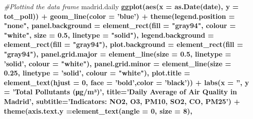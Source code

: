 \documentclass[
]{article}
\newenvironment{Shaded}{\begin{snugshade}}{\end{snugshade}}
\newcommand{\CommentTok}[1]{\textcolor[rgb]{0.56,0.35,0.01}{\textit{#1}}}
\newcommand{\DataTypeTok}[1]{\textcolor[rgb]{0.13,0.29,0.53}{#1}}
\newcommand{\DecValTok}[1]{\textcolor[rgb]{0.00,0.00,0.81}{#1}}
\newcommand{\FloatTok}[1]{\textcolor[rgb]{0.00,0.00,0.81}{#1}}
\newcommand{\KeywordTok}[1]{\textcolor[rgb]{0.13,0.29,0.53}{\textbf{#1}}}
\newcommand{\NormalTok}[1]{#1}
\newcommand{\OperatorTok}[1]{\textcolor[rgb]{0.81,0.36,0.00}{\textbf{#1}}}
\newcommand{\StringTok}[1]{\textcolor[rgb]{0.31,0.60,0.02}{#1}}
\begin{document}
\begin{Shaded}
\begin{Highlighting}[]
{{\CommentTok{#Plottind the data frame}
\NormalTok{madrid.daily }\OperatorTok{%>%}\StringTok{ }
\StringTok{  }\KeywordTok{ggplot}\NormalTok{(}\KeywordTok{aes}\NormalTok{(}\DataTypeTok{x =} \KeywordTok{as.Date}\NormalTok{(date), }
             \DataTypeTok{y =}\NormalTok{ tot_poll)) }\OperatorTok{+}\StringTok{ }
\StringTok{    }\KeywordTok{geom_line}\NormalTok{(}\DataTypeTok{color =} \StringTok{'blue'}\NormalTok{) }\OperatorTok{+}
\StringTok{    }\KeywordTok{theme}\NormalTok{(}\DataTypeTok{legend.position =} \StringTok{"none"}\NormalTok{,}
          \DataTypeTok{panel.background =} \KeywordTok{element_rect}\NormalTok{(}\DataTypeTok{fill =} \StringTok{"gray94"}\NormalTok{, }\DataTypeTok{colour =} \StringTok{"white"}\NormalTok{,}
                                      \DataTypeTok{size =} \FloatTok{0.5}\NormalTok{, }\DataTypeTok{linetype =} \StringTok{"solid"}\NormalTok{),}
          \DataTypeTok{legend.background =} \KeywordTok{element_rect}\NormalTok{(}\DataTypeTok{fill =} \StringTok{"gray94"}\NormalTok{),}
          \DataTypeTok{plot.background =} \KeywordTok{element_rect}\NormalTok{(}\DataTypeTok{fill =} \StringTok{"gray94"}\NormalTok{),}
          \DataTypeTok{panel.grid.major =} \KeywordTok{element_line}\NormalTok{(}\DataTypeTok{size =} \FloatTok{0.5}\NormalTok{, }\DataTypeTok{linetype =} \StringTok{'solid'}\NormalTok{, }\DataTypeTok{colour =}                                            \StringTok{"white"}\NormalTok{), }
          \DataTypeTok{panel.grid.minor =} \KeywordTok{element_line}\NormalTok{(}\DataTypeTok{size =} \FloatTok{0.25}\NormalTok{, }\DataTypeTok{linetype =} \StringTok{'solid'}\NormalTok{, }\DataTypeTok{colour =}                                           \StringTok{"white"}\NormalTok{),  }
          \DataTypeTok{plot.title =} \KeywordTok{element_text}\NormalTok{(}\DataTypeTok{hjust =} \DecValTok{0}\NormalTok{, }\DataTypeTok{face =} \StringTok{'bold'}\NormalTok{,}\DataTypeTok{color =} \StringTok{'black'}\NormalTok{)) }\OperatorTok{+}
\StringTok{    }\KeywordTok{labs}\NormalTok{(}\DataTypeTok{x =} \StringTok{''}\NormalTok{, }
         \DataTypeTok{y =} \StringTok{'Total Pollutants (μg/m³)'}\NormalTok{,}
         \DataTypeTok{title=}\StringTok{'Daily Average of Air Quality in Madrid'}\NormalTok{, }
         \DataTypeTok{subtitle=}\StringTok{'Indicators: NO2, O3, PM10, SO2, CO, PM25'}\NormalTok{) }\OperatorTok{+}
\StringTok{    }\KeywordTok{theme}\NormalTok{(}\DataTypeTok{axis.text.y =}\KeywordTok{element_text}\NormalTok{(}\DataTypeTok{angle =} \DecValTok{0}\NormalTok{,}
                                    \DataTypeTok{size =} \DecValTok{8}\NormalTok{),}
}}}
\end{Highlighting}
\end{Shaded}
\end{document}
